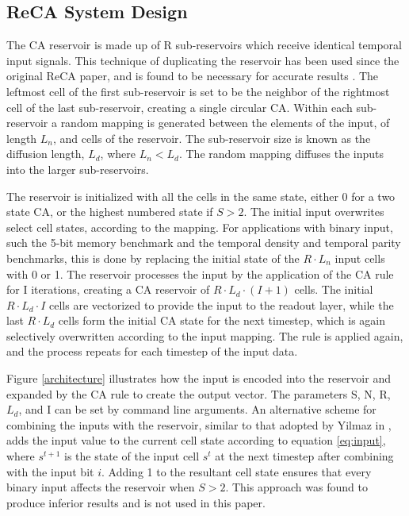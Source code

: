 \documentclass{elsarticle}
\begin{document}
\begin{multicols}{2}
\subsection{ReCA System Design}
The CA reservoir is made up of R sub-reservoirs which receive identical 
temporal input signals. This technique of duplicating the reservoir has been 
used since the original ReCA paper, and is found to be necessary for accurate 
results \cite{yilmaz2014reservoir}.
The leftmost cell of the first sub-reservoir is set to be the 
neighbor of the rightmost cell of the last sub-reservoir, creating a single 
circular CA.  Within each sub-reservoir a random mapping is generated between 
the elements of the input, of length $L_{n}$, and cells of the reservoir. The 
sub-reservoir size is known as the diffusion length, $L_{d}$, where $L_{n} < 
L_{d}$. The random mapping diffuses the inputs into the larger sub-reservoirs.  
\par The reservoir is initialized with all the cells in the same state, either 
0 for a two state CA, or the highest numbered state if $S > 2$. The initial 
input overwrites select cell states, according to the mapping. For applications 
with binary input, such the 5-bit memory benchmark and the temporal density and 
temporal parity benchmarks, this is done by replacing the initial state of the 
$R \cdot L_{n}$ input cells with 0 or 1.  The reservoir processes the input by 
the application of the CA rule for I iterations, creating a CA reservoir of $R 
\cdot L_{d} \cdot (I + 1)$ cells.  The initial $R \cdot L_{d} \cdot I$ cells 
are vectorized to provide the input to the readout layer, while the last $R 
\cdot L_{d}$ cells form the initial CA state for the next timestep, which is 
again selectively overwritten according to the input mapping. The rule is 
applied again, and the process repeats for each timestep of the input data.  
\par  


Figure \ref{architecture} illustrates how the input is encoded into the 
reservoir and expanded by the CA rule to create the output vector.  The 
parameters S, N, R, $L_{d}$, and I can be set by command line arguments. An 
alternative scheme for combining the inputs with the reservoir, similar to that 
adopted by Yilmaz in \cite{yilmaz2015connectionist}, adds the input value to 
the current cell state according to equation \ref{eq:input}, where $s^{t+1}$ is 
the state of the input cell $s^t$ at the next timestep after combining with the 
input bit $i$.  Adding 1 to the resultant cell state ensures that every binary 
input affects the reservoir when $S > 2$.  This approach was found to produce 
inferior results and is not used in this paper.


\end{multicols}
\end{document}
